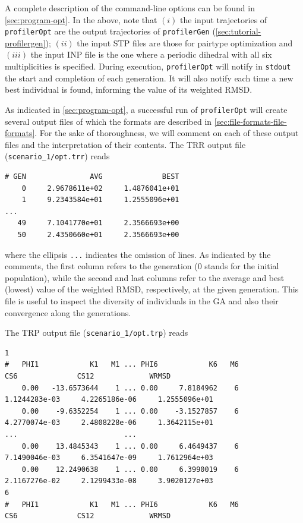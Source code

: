 \documentclass[10pt,a4paper,openany]{memoir}
\numberwithin{equation}{section}
\newcommand{\under}{\_}
\newcommand{\profileropt}[0]{\texttt{profilerOpt}}
\newcommand{\profilergen}[0]{\texttt{profilerGen}}
\begin{document}
\noindent A complete description of the command-line options can be
found in \autoref{sec:program-opt}.
%
In the above, note that $(i)$ the input trajectories of \profileropt{}
are the output trajectories of \profilergen{}
(\autoref{sec:tutorial-profilergen});
%
$(ii)$ the input STP files are those for pairtype optimization
%
and $(iii)$ the input INP file is the one where a periodic dihedral
with all six multiplicities is specified.
%
During execution, \profileropt{} will notify in \texttt{stdout} the
start and completion of each generation.
%
It will also notify each time a new best individual is found,
informing the value of its weighted RMSD.
%

As indicated in \autoref{sec:program-opt}, a successful run of
\profileropt{} will create several output files of which the formats
are described in \autoref{sec:file-formats-file-formats}.
%
For the sake of thoroughness, we will comment on each of these output
files and the interpretation of their contents.
%
The TRR output file (\texttt{scenario\under{}1/opt.trr}) reads

\begin{lstlisting}
# GEN               AVG              BEST
    0     2.9678611e+02     1.4876041e+01
    1     9.2343584e+01     1.2555096e+01
...
   49     7.1041770e+01     2.3566693e+00
   50     2.4350660e+01     2.3566693e+00
\end{lstlisting}\vspace{1ex}\par

\noindent where the ellipsis \texttt{...} indicates the omission of
lines.
%
As indicated by the comments, the first column refers to the
generation (0 stands for the initial population), while the second and
last columns refer to the average and best (lowest) value of the
weighted RMSD, respectively, at the given generation.
%
This file is useful to inspect the diversity of individuals in the GA
and also their convergence along the generations.

The TRP output file (\texttt{scenario\under{}1/opt.trp}) reads

\begin{lstlisting}
1    
#   PHI1            K1   M1 ... PHI6            K6   M6               CS6              CS12             WRMSD
    0.00   -13.6573644    1 ... 0.00     7.8184962    6     1.1244283e-03     4.2265186e-06     1.2555096e+01
    0.00    -9.6352254    1 ... 0.00    -3.1527857    6     4.2770074e-03     2.4808228e-06     1.3642115e+01
...                         ...
    0.00    13.4845343    1 ... 0.00     6.4649437    6     7.1490046e-03     6.3541647e-09     1.7612964e+03
    0.00    12.2490638    1 ... 0.00     6.3990019    6     2.1167276e-02     2.1299433e-08     3.9020127e+03
6    
#   PHI1            K1   M1 ... PHI6            K6   M6               CS6              CS12             WRMSD
\end{lstlisting}\vspace{1ex}\par
\end{document}
